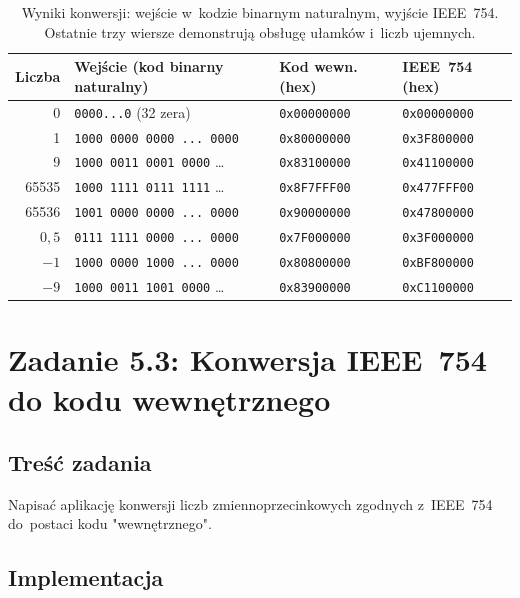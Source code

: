 \documentclass[12pt,a4paper]{article}
\begin{document}
\begin{table}[H]
\centering
\small
\begin{tabular}{rlll}
\toprule
\textbf{Liczba} & \textbf{Wejście (kod binarny naturalny)} & \textbf{Kod wewn. (hex)} & \textbf{IEEE~754 (hex)} \\
\midrule
0     & \texttt{0000...0} (32 zera)              & \texttt{0x00000000} & \texttt{0x00000000} \\
1     & \texttt{1000 0000 0000 ... 0000}         & \texttt{0x80000000} & \texttt{0x3F800000} \\
9     & \texttt{1000 0011 0001 0000} \ldots      & \texttt{0x83100000} & \texttt{0x41100000} \\
65535 & \texttt{1000 1111 0111 1111} \ldots      & \texttt{0x8F7FFF00} & \texttt{0x477FFF00} \\
65536 & \texttt{1001 0000 0000 ... 0000}         & \texttt{0x90000000} & \texttt{0x47800000} \\
\midrule
$0{,}5$ & \texttt{0111 1111 0000 ... 0000}       & \texttt{0x7F000000} & \texttt{0x3F000000} \\
$-1$    & \texttt{1000 0000 1000 ... 0000}       & \texttt{0x80800000} & \texttt{0xBF800000} \\
$-9$    & \texttt{1000 0011 1001 0000} \ldots    & \texttt{0x83900000} & \texttt{0xC1100000} \\
\bottomrule
\end{tabular}
\caption{Wyniki konwersji: wejście w~kodzie binarnym naturalnym, wyjście IEEE~754.
         Ostatnie trzy wiersze demonstrują obsługę ułamków i~liczb ujemnych.}
\end{table}

\section*{Zadanie 5.3: Konwersja IEEE~754 do kodu wewnętrznego}

\subsection*{Treść zadania}

Napisać aplikację konwersji liczb zmiennoprzecinkowych zgodnych z~IEEE~754
do~postaci kodu "wewnętrznego".

\subsection*{Implementacja}
\end{document}
